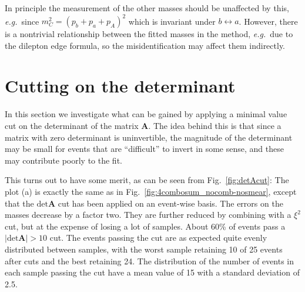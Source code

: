 \documentclass[twoside,english]{uiofysmaster}
\begin{document}
In principle the measurement of the other masses should be unaffected by this, {\it e.g.}\ since $m_C^2 = (p_b + p_a + p_A)^2$ which is invariant under $b\leftrightarrow a$. However, there is a nontrivial relationship between the fitted masses in the method, {\it e.g.}\ due to the dilepton edge formula, so the misidentification may affect them indirectly.

\section{Cutting on the determinant}
In this section we investigate what can be gained by applying a minimal value cut on the determinant of the matrix $\mathbf{A}$. The idea behind this is that since a matrix with zero determinant is uninvertible, the magnitude of the determinant may be small for events that are ``difficult'' to invert in some sense, and these may contribute poorly to the fit. 

This turns out to have some merit, as can be seen from Fig.\ \ref{fig:detAcut}: The plot (a) is exactly the same as in Fig.\ \ref{fig:4combosum_nocomb-nosmear}, except that the $\mathrm{det}\mathbf{A}$ cut has been applied on an event-wise basis. The errors on the masses decrease by a factor two. They are further reduced by combining with a $\xi^2$ cut, but at the expense of losing a lot of samples. About 60\% of events pass a $|\mathrm{det}\mathbf A|>10$ cut. The events passing the cut are as expected quite evenly distributed between samples, with the worst sample retaining 10 of 25 events after cuts and the best retaining 24. The distribution of the number of events in each sample passing the cut have a mean value of 15 with a standard deviation of 2.5. 
\end{document}
